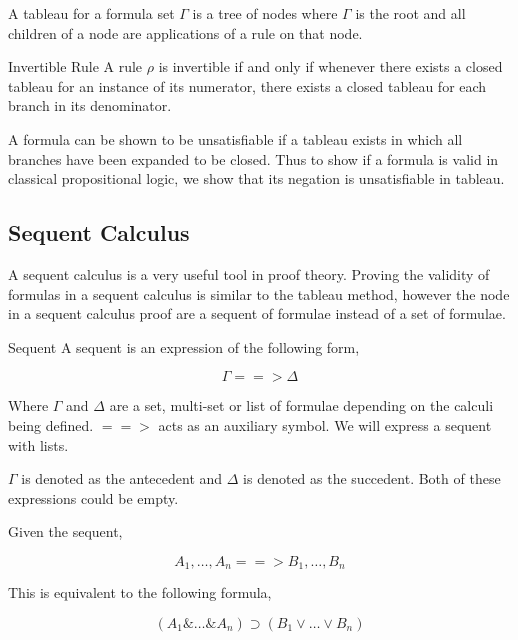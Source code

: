 A tableau for a formula set $\Gamma$ is a tree of nodes where $\Gamma$ is the
root and all children of a node are applications of a rule on that node.

\begin{definition}{Invertible Rule}
A rule $\rho$ is invertible if and only if whenever there exists a closed
tableau for an instance of its numerator, there exists a closed tableau for
each branch in its denominator.
\end{definition}

A formula can be shown to be unsatisfiable if a tableau exists in which all
branches have been expanded to be closed. Thus to show if a formula is valid in
classical propositional logic, we show that its negation is unsatisfiable in
tableau.

\subsection{Sequent Calculus}

A sequent calculus is a very useful tool in proof theory. Proving the validity
of formulas in a sequent calculus is similar to the tableau method, however the
node in a sequent calculus proof are a sequent of formulae instead of a set of
formulae.

\begin{definition}{Sequent}
A sequent is an expression of the following form,

\begin{equation*}
\Gamma ==> \Delta
\end{equation*}

Where $\Gamma$ and $\Delta$ are a set, multi-set or list of formulae depending
on the calculi being defined. $==>$ acts as an auxiliary symbol. We will
express a sequent with lists.

$\Gamma$ is denoted as the antecedent and $\Delta$ is denoted as the succedent.
Both of these expressions could be empty.

Given the sequent,

\begin{equation*}
A_1, \ldots, A_n ==> B_1, \ldots, B_n
\end{equation*}

This is equivalent to the following formula,

\begin{equation*}
(A_1 \& \ldots \& A_n) \supset (B_1 \vee \ldots \vee B_n)
\end{equation*}

\end{definition}

